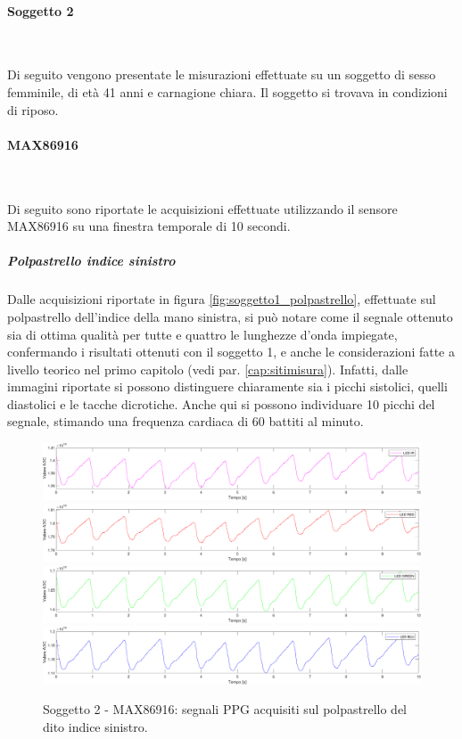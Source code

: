 \clearpage
\paragraph{Soggetto 2}~

Di seguito vengono presentate le misurazioni effettuate su un soggetto di sesso femminile, di età 41 anni e carnagione chiara. Il soggetto si trovava in condizioni di riposo.

\paragraph{MAX86916}~

Di seguito sono riportate le acquisizioni effettuate utilizzando il sensore MAX86916 su una finestra temporale di 10 secondi.

\subparagraph{Polpastrello indice sinistro}
Dalle acquisizioni riportate in figura \ref{fig:soggetto1_polpastrello}, effettuate sul polpastrello dell'indice della mano sinistra, si può notare come il segnale ottenuto sia di ottima qualità per tutte e quattro le lunghezze d'onda impiegate, confermando i risultati ottenuti con il soggetto 1, e anche le considerazioni fatte a livello teorico nel primo capitolo (vedi par. \ref{cap:sitimisura}). Infatti, dalle immagini riportate si possono distinguere chiaramente sia i picchi sistolici, quelli diastolici e le tacche dicrotiche. Anche qui si possono individuare 10 picchi del segnale, stimando una frequenza cardiaca di 60 battiti al minuto.
\begin{figure}[h]
	\centering
	\includegraphics[width=1\linewidth]{ImageFiles/Misure Preliminari/Soggetto 2/max86916/polpastrello_ired}
	\includegraphics[width=1\linewidth]{ImageFiles/Misure Preliminari/Soggetto 2/max86916/polpastrello_red}
	\includegraphics[width=1\linewidth]{ImageFiles/Misure Preliminari/Soggetto 2/max86916/polpastrello_green}
	\includegraphics[width=1\linewidth]{ImageFiles/Misure Preliminari/Soggetto 2/max86916/polpastrello_blu}
	\caption{Soggetto 2 - MAX86916: segnali PPG acquisiti sul polpastrello del dito indice sinistro.}
	\label{fig:soggetto2_MAX86916_polpastrello}
\end{figure}

